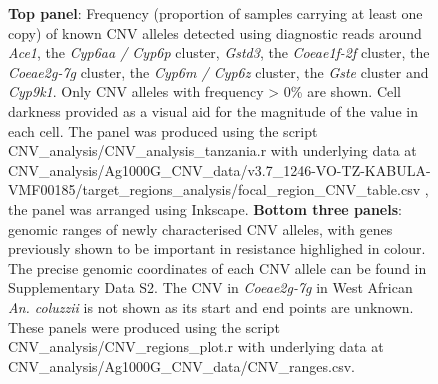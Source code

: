 \documentclass[a4paper,12pt]{article}
\begin{document}
\begin{figure}[h]
	\begin{center}
		\vskip 1cm
		\vskip 1cm
		\vskip 1cm
	\end{center}
	\caption{\footnotesize \textbf{Top panel}: Frequency (proportion of samples carrying at least one copy) of known CNV alleles detected using diagnostic reads around \textit{Ace1}, the \textit{Cyp6aa / Cyp6p} cluster, \textit{Gstd3}, the \textit{Coeae1f-2f} cluster, the \textit{Coeae2g-7g} cluster, the \textit{Cyp6m / Cyp6z} cluster, the \textit{Gste} cluster and \textit{Cyp9k1}. Only CNV alleles with frequency > 0\% are shown. Cell darkness provided as a visual aid for the magnitude of the value in each cell. The panel was produced using the script CNV\_analysis/CNV\_analysis\_tanzania.r with underlying data at CNV\_analysis/Ag1000G\_CNV\_data/v3.7\_1246-VO-TZ-KABULA-VMF00185/target\_regions\_analysis/focal\_region\_CNV\_table.csv , the panel was arranged using Inkscape. \textbf{Bottom three panels}: genomic ranges of newly characterised CNV alleles, with genes previously shown to be important in resistance highlighed in colour. The precise genomic coordinates of each CNV allele can be found in Supplementary Data S2. The CNV in \textit{Coeae2g-7g} in West African \textit{An. coluzzii} is not shown as its start and end points are unknown. These panels were produced using the script CNV\_analysis/CNV\_regions\_plot.r with underlying data at CNV\_analysis/Ag1000G\_CNV\_data/CNV\_ranges.csv.}

\end{figure}
\end{document}
